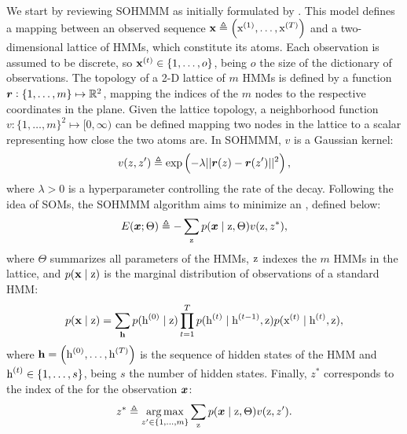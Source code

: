 We start by reviewing SOHMMM as initially formulated by \citet{Ferles2008}. This model defines a mapping between an observed sequence ${\mathbf{x}} \triangleq \left({\textnormal{x}}^{(1)}, \dots, {\textnormal{x}}^{(T)} \right)$ and a two-dimensional lattice of HMMs, which constitute its atoms. Each observation is assumed to be discrete, so ${\mathbf{x}}^{(t)} \in \{1,\dots,o\}$, being $o$ the size of the dictionary of observations. The topology of a 2-D lattice of $m$ HMMs is defined by a function ${\bm{r}}: \{1, \dots, m\} \mapsto \mathbb{R}^2$, mapping the indices of the $m$ nodes to the respective coordinates in the plane. Given the lattice topology, a neighborhood function $v: \{1, \dots, m\}^2 \mapsto [0, \infty)$ can be defined mapping two nodes in the lattice to a scalar representing how close the two atoms are. In SOHMMM, $v$ is a Gaussian kernel:
\begin{equation}
\label{eq:sohmmm_distance}
v(z,z') \triangleq \exp\left(-\lambda||{\bm{r}}(z)-{\bm{r}}(z')||^{2}\right),
\end{equation}
where $\lambda > 0$ is a hyperparameter controlling the rate of the decay.
Following the idea of SOMs, the SOHMMM algorithm aims to minimize an , defined below:
\begin{equation}
\label{eq:sohmmm_energy}
E({\bm{x}}; \Theta) \triangleq -\sum_{{\textnormal{z}}} p({\bm{x}} \mid {\textnormal{z}}, \Theta)v({\textnormal{z}}, z^*),
\end{equation}
where $\Theta$ summarizes all parameters of the HMMs, ${\textnormal{z}}$ indexes the $m$ HMMs in the lattice, and $p({\mathbf{x}} \mid {\textnormal{z}})$ is the marginal distribution of observations of a standard HMM:
\begin{equation}
\label{eq:sohmmm_hmm}
p({\mathbf{x}} \mid {\textnormal{z}}) = \sum_{{\mathbf{h}}} p({\textnormal{h}}^{(0)} \mid {\textnormal{z}}) \prod_{t=1}^T p({\textnormal{h}}^{(t)} \mid {\textnormal{h}}^{(t-1)},{\textnormal{z}}) p({\textnormal{x}}^{(t)} \mid {\textnormal{h}}^{(t)},{\textnormal{z}}),
\end{equation}
where ${\mathbf{h}} = \left({\textnormal{h}}^{(0)},\dots,{\textnormal{h}}^{(T)}\right)$ is the sequence of hidden states of the HMM and ${\textnormal{h}}^{(t)} \in \{1, \dots, s\}$, being $s$ the number of hidden states. Finally, $z^*$ corresponds to the index of the  for the observation ${\bm{x}}$:
\begin{equation}
\label{eq:sohmmm_winner}
z^* \triangleq \operatorname*{arg\,max}_{z' \in \{1,\dots,m\}} \sum_{{\textnormal{z}}} p({\bm{x}} \mid {\textnormal{z}}, \Theta)v({\textnormal{z}}, z').
\end{equation}

